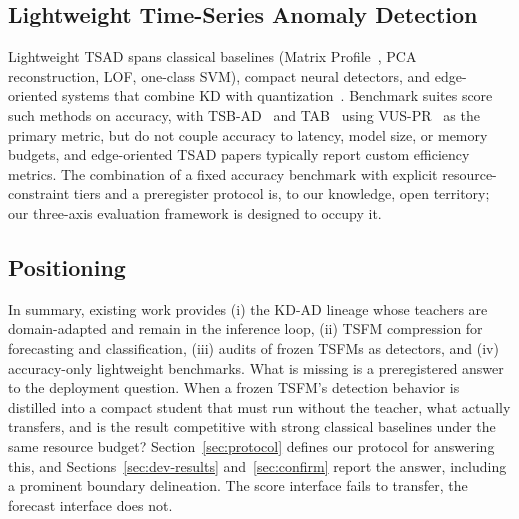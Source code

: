 \subsection{Lightweight Time-Series Anomaly Detection}
Lightweight TSAD spans classical baselines (Matrix
Profile~\cite{matrixprofile2016}, PCA reconstruction, LOF, one-class SVM),
compact neural detectors, and edge-oriented systems that combine KD with
quantization~\cite{unifiededge2024}. Benchmark suites score such methods on
accuracy, with TSB-AD~\cite{tsbad2024} and TAB~\cite{tab2025} using
VUS-PR~\cite{vus2022} as the primary metric, but do not couple accuracy to
latency, model size, or memory budgets, and edge-oriented TSAD papers
typically report custom efficiency metrics. The combination of a fixed
accuracy benchmark with explicit resource-constraint tiers and a preregister
protocol is, to our knowledge, open territory; our three-axis evaluation
framework is designed to occupy it.

\subsection{Positioning}
In summary, existing work provides (i) the KD-AD lineage whose teachers are
domain-adapted and remain in the inference loop, (ii) TSFM compression for
forecasting and classification, (iii) audits of frozen TSFMs as detectors,
and (iv) accuracy-only lightweight benchmarks. What is missing is a
preregistered answer to the deployment question. When a frozen TSFM's
detection behavior is distilled into a compact student that
must run without the teacher, what actually transfers, and is the result
competitive with strong classical baselines under the same resource budget?
Section~\ref{sec:protocol} defines our protocol for answering this, and
Sections~\ref{sec:dev-results} and~\ref{sec:confirm} report the answer, including a
prominent boundary delineation. The score interface fails to transfer, the forecast interface does not.
